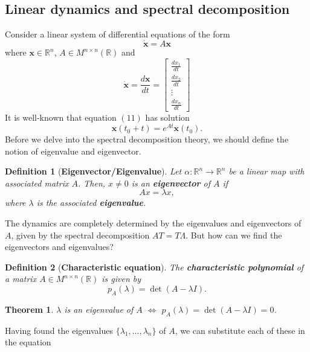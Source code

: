 \documentclass[]{article}
\newtheorem{definition}{Definition}
\newtheorem{theorem}{Theorem}
\begin{document}
\subsection{Linear dynamics and spectral decomposition}
Consider a linear system of differential equations of the form
\begin{equation}
	\dot{\textbf{x}}=A\textbf{x}	
\end{equation}
where $\textbf{x} \in \mathbb{R}^n$, $A \in M^{n \times n}(\mathbb{R})$ and
\begin{equation}
	\dot{\textbf{x}}=\frac{d\textbf{x}}{dt}=\begin{bmatrix}
		\frac{dx_1}{dt} \\
		\frac{dx_2}{dt} \\
		\vdots \\
		\frac{dx_n}{dt}
	\end{bmatrix}
\end{equation}
It is well-known that equation $(11)$ has solution
\begin{equation}
	\textbf{x}(t_0+t)=e^{At}\textbf{x}(t_0).
\end{equation}
Before we delve into the spectral decomposition theory, we should define the notion of eigenvalue and eigenvector.
\begin{definition}[\textbf{Eigenvector/Eigenvalue}]
Let $\alpha: \mathbb{R}^n \to \mathbb{R}^n$ be a linear map with associated matrix $A$. Then, $x \neq 0$ is an \textbf{eigenvector} of $A$ if
\begin{equation}
	Ax=\lambda x,
\end{equation}
where $\lambda$ is the associated \textbf{eigenvalue}.
\end{definition}
The dynamics are completely determined by the eigenvalues and eigenvectors of $A$, given by the spectral decomposition $AT=T\Lambda$. But how can we find the eigenvectors and eigenvalues?
\begin{definition}[\textbf{Characteristic equation}]
The \textbf{characteristic polynomial} of a matrix $A \in M^{n \times n}(\mathbb{R})$ is given by
\begin{equation}
	p_A(\lambda)=\det(A-\lambda I).
\end{equation}
\end{definition}
\begin{theorem}
$\lambda$ is an eigenvalue of $A$ $\iff$ $p_A(\lambda)=\det(A-\lambda I)=0$.
\end{theorem}
Having found the eigenvalues $\{\lambda_1,\dots,\lambda_n\}$ of $A$, we can substitute each of these in the equation 
\end{document}

